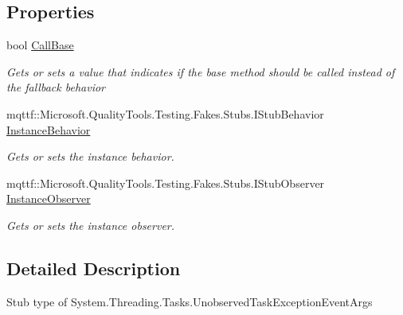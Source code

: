 \subsection*{Properties}
\begin{DoxyCompactItemize}
\item 
bool \hyperlink{class_system_1_1_threading_1_1_tasks_1_1_fakes_1_1_stub_unobserved_task_exception_event_args_aef4f8fe4c24fc571fcdf5c58b5911231}{Call\-Base}
\begin{DoxyCompactList}\small\item\em Gets or sets a value that indicates if the base method should be called instead of the fallback behavior\end{DoxyCompactList}\item 
mqttf\-::\-Microsoft.\-Quality\-Tools.\-Testing.\-Fakes.\-Stubs.\-I\-Stub\-Behavior \hyperlink{class_system_1_1_threading_1_1_tasks_1_1_fakes_1_1_stub_unobserved_task_exception_event_args_adc50950780e15a3cc9084c92fc7c65b1}{Instance\-Behavior}
\begin{DoxyCompactList}\small\item\em Gets or sets the instance behavior.\end{DoxyCompactList}\item 
mqttf\-::\-Microsoft.\-Quality\-Tools.\-Testing.\-Fakes.\-Stubs.\-I\-Stub\-Observer \hyperlink{class_system_1_1_threading_1_1_tasks_1_1_fakes_1_1_stub_unobserved_task_exception_event_args_ad68485711e2845b01a75443ba1551c6e}{Instance\-Observer}
\begin{DoxyCompactList}\small\item\em Gets or sets the instance observer.\end{DoxyCompactList}\end{DoxyCompactItemize}


\subsection{Detailed Description}
Stub type of System.\-Threading.\-Tasks.\-Unobserved\-Task\-Exception\-Event\-Args



